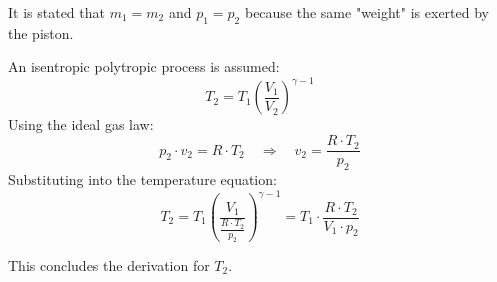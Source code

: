 It is stated that \( m_1 = m_2 \) and \( p_1 = p_2 \) because the same "weight" is exerted by the piston.  

An isentropic polytropic process is assumed:  
\[
T_2 = T_1 \left( \frac{V_1}{V_2} \right)^{\gamma - 1}
\]  
Using the ideal gas law:  
\[
p_2 \cdot v_2 = R \cdot T_2 \quad \Rightarrow \quad v_2 = \frac{R \cdot T_2}{p_2}
\]  
Substituting into the temperature equation:  
\[
T_2 = T_1 \left( \frac{V_1}{\frac{R \cdot T_2}{p_2}} \right)^{\gamma - 1} = T_1 \cdot \frac{R \cdot T_2}{V_1 \cdot p_2}
\]  

This concludes the derivation for \( T_2 \).